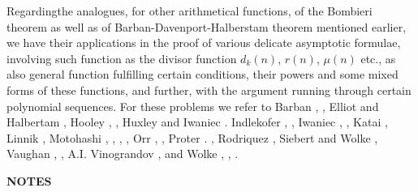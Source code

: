 Regarding\pageoriginale the analogues, for other arithmetical functions, of the
Bombieri theorem as well as of Barban-Davenport-Halberstam theorem
mentioned earlier, we have their applications in the proof of various
delicate asymptotic formulae, involving such function as the divisor
function $d_k(n)$, $r(n)$, $\mu (n)$ etc., as also general function
fulfilling certain conditions, their powers and some mixed forms of
these functions, and further, with the argument running through
certain polynomial sequences. For these problems we refer to Barban
\cite{key6}, \cite{key10}, Elliot and Halbertam \cite{key1}, Hooley
\cite{key1}, \cite{key6}, Huxley and Iwaniec \cite{key1}. Indlekofer
\cite{key1}, \cite{key2}, Iwaniec \cite{key2}, \cite{key5}, Katai
\cite{key1}, Linnik \cite{key4}, Motohashi \cite{key1}, \cite{key2},
\cite{key4}, \cite{key7}, Orr
\cite{key1}, \cite{key2}, Proter \cite{key2}. \cite{key3}, Rodriquez
\cite{key1}, Siebert and Wolke \cite{key1}, Vaughan \cite{key4},
\cite{key5}, A.I. Vinograndov \cite{key1}, and Wolke \cite{key3}, 
\cite{key5}, \cite{key6}. 

\medskip

\begin{center}
{\bf NOTES}
\end{center}   

